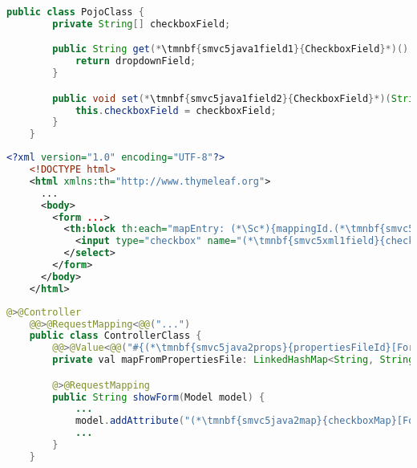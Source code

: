 \enlargethispage{10mm}
\begin{lstlisting}[language=Java, title={POJO class with one array field}]
    public class PojoClass {
        private String[] checkboxField;

        public String get(*\tmnbf{smvc5java1field1}{CheckboxField}*)() {
            return dropdownField;
        }

        public void set(*\tmnbf{smvc5java1field2}{CheckboxField}*)(String[] checkboxField) {
            this.checkboxField = checkboxField;
        }
    }
\end{lstlisting}
\begin{lstlisting}[language=XML, title={HTML form setting the field}]
    <?xml version="1.0" encoding="UTF-8"?>
    <!DOCTYPE html>
    <html xmlns:th="http://www.thymeleaf.org">
      ...
      <body>
        <form ...>
          <th:block th:each="mapEntry: (*\Sc*){mappingId.(*\tmnbf{smvc5xml1map}{checkboxMap}[ForestGreen]*).entrySet()}">
            <input type="checkbox" name="(*\tmnbf{smvc5xml1field}{checkboxField}[ForestGreen]*)" th:value="(*\Sc*){mapEntry.key}"><span th:text="(*\Sc*){mapEntry.value}"/><br/>
          </select>
        </form>
      </body>
    </html>
\end{lstlisting}
\begin{lstlisting}[language=Java, title={Controller converting \textit{properties} file to a map}]
    @>@Controller
    @@>@RequestMapping<@@("...")
    public class ControllerClass {
        @@>@Value<@@("#{(*\tmnbf{smvc5java2props}{propertiesFileId}[ForestGreen]*)}") // Parsing the properties file
        private val mapFromPropertiesFile: LinkedHashMap<String, String>;

        @>@RequestMapping
        public String showForm(Model model) {
            ...
            model.addAttribute("(*\tmnbf{smvc5java2map}{checkboxMap}[ForestGreen]*)", mapFromPropertiesFile)
            ...
        }
    }
\end{lstlisting}
\newpage


